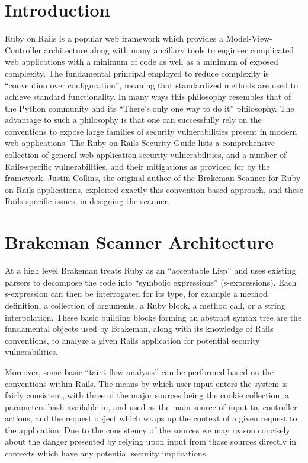 \documentclass[conference]{IEEEtran}
\begin{document}
\section{Introduction}

Ruby on Rails is a popular web framework which provides a Model-View-Controller
architecture along with many ancillary tools to engineer complicated web
applications with a minimum of code as well as a minimum of exposed complexity.
The fundamental principal employed to reduce complexity is ``convention over
configuration'', meaning that standardized methods are used to achieve standard
functionality.  In many ways this philosophy resembles that of the Python
community and its ``There's only one way to do it'' philosophy.  The
advantage to such a philosophy is that one can successfully rely on the
conventions to expose large families of security vulnerabilities present in
modern web applications.  The Ruby on Rails Security Guide\cite{rails_security}
lists a comprehensive collection of general web application security
vulnerabilities, and a number of Rails-specific vulnerabilities, and their
mitigations as provided for by the framework.  Justin Collins, the original
author of the Brakeman Scanner for Ruby on Rails applications, exploited exactly
this convention-based approach, and these Rails-specific issues, in designing
the scanner.

\section{Brakeman Scanner Architecture}

At a high level Brakeman treats Ruby as an ``acceptable Lisp'' and uses
existing parsers to decompose the code into ``symbolic expressions''
(s-expressions)\cite{sexp_for_rubyists}.  Each s-expression can then be
interrogated for its type, for example a method definition, a collection of
arguments, a Ruby block, a method call, or a string interpolation.  These basic
building blocks forming an abstract syntax tree are the fundamental objects used
by Brakeman, along with its knowledge of Rails conventions, to analyze a given
Rails application for potential security vulnerabilities.

Moreover, some basic ``taint flow analysis'' can be performed based on the conventions
within Rails.  The means by which user-input enters the system is fairly consistent, with
three of the major sources being the cookie collection, a parameters hash available in,
and used as the main source of input to, controller actions, and the request object which
wraps up the context of a given request to the application.  Due to the consistency of the
sources we may reason concisely about the danger presented by relying upon input from
those sources directly in contexts which have any potential security implications.
\end{document}
